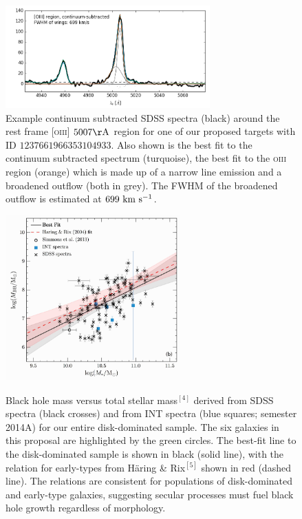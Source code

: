 \documentclass[12pt]{article}
\begin{document}
\vspace{1.5em}
\begin{figure}
\begin{centering}

\includegraphics[width=0.7\textwidth]{53062_1445_246_spectra_oiii_region.png} \\
\caption{Example continuum subtracted SDSS spectra (black) around the rest frame \textsc{[oiii]} $5007\rm{\AA}$ region for one of our proposed targets with ID $1237661966353104933$. Also shown is the best fit to the continuum subtracted spectrum (turquoise), the best fit to the \textsc{oiii} region (orange) which is made up of a narrow line emission and a broadened outflow (both in grey). The FWHM of the broadened outflow is estimated at $699~\rm{km}~\rm{s}^{-1}$.}

\vspace{1.5em}


\includegraphics[width=0.6\textwidth]{fig2_r.pdf} \\
\caption{Black hole mass versus total stellar mass$^{[4]}$ derived from SDSS spectra (black crosses) and from INT spectra (blue squares; semester 2014A) for our entire disk-dominated sample. The six galaxies in this proposal are highlighted by the green circles. The best-fit line to the disk-dominated sample is shown in black (solid line), with the relation for early-types from Häring \& Rix$^{[5]}$ shown in red (dashed line). The relations are consistent for populations of disk-dominated and early-type galaxies, suggesting secular processes must fuel black hole growth regardless of morphology.}

\end{centering}
\end{figure}
\end{document}
